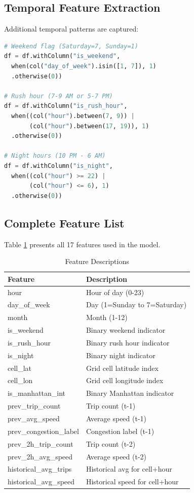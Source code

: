 \documentclass[conference]{IEEEtran}
\begin{document}
\subsection{Temporal Feature Extraction}

Additional temporal patterns are captured:

\begin{lstlisting}[caption={Temporal Features},language=Python]
# Weekend flag (Saturday=7, Sunday=1)
df = df.withColumn("is_weekend",
  when(col("day_of_week").isin([1, 7]), 1)
  .otherwise(0))

# Rush hour (7-9 AM or 5-7 PM)
df = df.withColumn("is_rush_hour",
  when((col("hour").between(7, 9)) | 
       (col("hour").between(17, 19)), 1)
  .otherwise(0))

# Night hours (10 PM - 6 AM)
df = df.withColumn("is_night",
  when((col("hour") >= 22) | 
       (col("hour") <= 6), 1)
  .otherwise(0))
\end{lstlisting}

\subsection{Complete Feature List}

Table \ref{tab:features} presents all 17 features used in the model.

\begin{table}[htbp]
\caption{Feature Descriptions}
\begin{center}
\begin{tabular}{|l|l|}
\hline
\textbf{Feature} & \textbf{Description} \\
\hline
hour & Hour of day (0-23) \\
day\_of\_week & Day (1=Sunday to 7=Saturday) \\
month & Month (1-12) \\
is\_weekend & Binary weekend indicator \\
is\_rush\_hour & Binary rush hour indicator \\
is\_night & Binary night indicator \\
\hline
cell\_lat & Grid cell latitude index \\
cell\_lon & Grid cell longitude index \\
is\_manhattan\_int & Binary Manhattan indicator \\
\hline
prev\_trip\_count & Trip count (t-1) \\
prev\_avg\_speed & Average speed (t-1) \\
prev\_congestion\_label & Congestion label (t-1) \\
prev\_2h\_trip\_count & Trip count (t-2) \\
prev\_2h\_avg\_speed & Average speed (t-2) \\
\hline
historical\_avg\_trips & Historical avg for cell+hour \\
historical\_avg\_speed & Historical speed for cell+hour \\
\hline
\end{tabular}
\label{tab:features}
\end{center}
\end{table}
\end{document}
